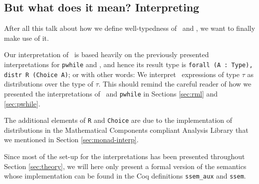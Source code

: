 \documentclass[11pt, leqno, titlepage]{article}
\def\coqe{\lstinline[language=Coq, basicstyle=\small]}
\theoremstyle{definition}
\begin{document}
\subsection{But what does it mean? Interpreting \srml}
\label{sec:rmlx-interp}
After all this talk about how we define well-typedness of \rmlx\ and \srml, we want
to finally make use of it.

Our interpretation of \srml\ is based heavily on the previously presented
interpretations for \texttt{pwhile} and \rml, and hence its result type is
\coqe{forall (A : Type), distr R (Choice A)}; or with other words: We interpret
\srml\ expressions of type $\tau$ as distributions over the type of $\tau$. This
should remind the careful reader of how we presented the interpretations of \rml\ and
\texttt{pwhile} in Sections \ref{sec:rml} and \ref{sec:pwhile}.

The additional elements of \coqe{R} and \coqe{Choice} are due to the implementation
of distributions in the Mathematical Components compliant Analysis Library that we
mentioned in Section \ref{sec:monad-interp}.

Since most of the set-up for the interpretations has been presented throughout
Section \ref{sec:theory}, we will here only present a formal version of the
semantics whose implementation can be found in the Coq definitions \coqe{ssem_aux}
and \coqe{ssem}. 
\end{document}
